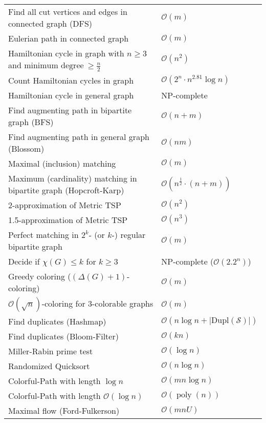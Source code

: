 \documentclass[a4paper,10pt]{article}
\newcommand{\bigO}{\mathcal{O}}
\DeclareMathOperator{\poly}{poly}
\begin{document}
    \begin{center}
    \begin{tabularx}{\textwidth}{Xl}
        \toprule
        Find all cut vertices and edges in connected graph (DFS) & \(\bigO(m)\) \\
        Eulerian path in connected graph & \(\bigO(m)\) \\
        Hamiltonian cycle in graph with $n \geq 3$ and $\text{minimum degree} \ \geq \frac{n}{2}$ & \(\bigO(n^2)\) \\
        Count Hamiltonian cycles in graph & \(\bigO(2^n \cdot n^{2.81} \log n)\) \\
        Hamiltonian cycle in general graph & NP-complete \\
        Find augmenting path in bipartite graph (BFS) & \(\bigO(n + m)\) \\
        Find augmenting path in general graph (Blossom) & \(\bigO(nm)\) \\
        Maximal (inclusion) matching & \(\bigO(m)\) \\
        Maximum (cardinality) matching in bipartite graph (Hopcroft-Karp) & \(\bigO(n^\frac{1}{2} \cdot (n+m))\) \\
        2-approximation of Metric TSP & \(\bigO(n^2)\) \\
        1.5-approximation of Metric TSP & \(\bigO(n^3)\) \\
        Perfect matching in \(2^k\)- (or $k$-) regular bipartite graph & \(\bigO(m)\) \\
        Decide if $\chi(G) \leq k$ for $k \geq 3$ & NP-complete ($\bigO(2.2^n)$) \\
        Greedy coloring ($(\Delta(G) + 1)$-coloring) & \(\bigO(m)\) \\
        \(\bigO(\sqrt{n})\)-coloring for 3-colorable graphs & \(\bigO(m)\) \\
        Find duplicates (Hashmap) & \(\bigO(n \log n + |\text{Dupl}(\mathcal{S})|)\) \\
        Find duplicates (Bloom-Filter) & \(\bigO(kn)\) \\
        Miller-Rabin prime test & \(\bigO(\log n)\) \\
        Randomized Quicksort & \(\bigO(n \log n)\)\footnotemark \\
        Colorful-Path with length \(\log n\) & \(\bigO(mn \log n)\) \\
        Colorful-Path with length \(\bigO(\log n)\) & \(\bigO(\poly(n))\) \\
        Maximal flow (Ford-Fulkerson) & \(\bigO(mnU)\)\\

\end{tabularx}
\end{center}
\end{document}
